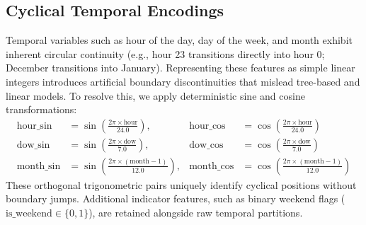 \documentclass[11pt,a4paper]{article}
\begin{document}
\subsection{Cyclical Temporal Encodings}
Temporal variables such as hour of the day, day of the week, and month exhibit inherent circular continuity (e.g., hour 23 transitions directly into hour 0; December transitions into January). Representing these features as simple linear integers introduces artificial boundary discontinuities that mislead tree-based and linear models. To resolve this, we apply deterministic sine and cosine transformations:
\begin{align}
\text{hour\_sin} &= \sin\left(\frac{2\pi \times \text{hour}}{24.0}\right), & \text{hour\_cos} &= \cos\left(\frac{2\pi \times \text{hour}}{24.0}\right) \\
\text{dow\_sin} &= \sin\left(\frac{2\pi \times \text{dow}}{7.0}\right), & \text{dow\_cos} &= \cos\left(\frac{2\pi \times \text{dow}}{7.0}\right) \\
\text{month\_sin} &= \sin\left(\frac{2\pi \times (\text{month} - 1)}{12.0}\right), & \text{month\_cos} &= \cos\left(\frac{2\pi \times (\text{month} - 1)}{12.0}\right)
\end{align}
These orthogonal trigonometric pairs uniquely identify cyclical positions without boundary jumps. Additional indicator features, such as binary weekend flags ($\text{is\_weekend} \in \{0, 1\}$), are retained alongside raw temporal partitions.
\end{document}
